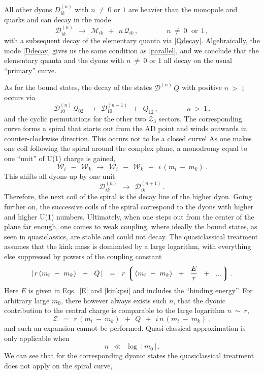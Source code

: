 \documentclass[epsfig,12pt]{article}
\def\beq{\begin{equation}}
\def\eeq{\end{equation}}
\def\beq{\begin{equation}}
\def\eeq{\end{equation}}
\newcommand{\mc}[1]{\mathcal{#1}}
\newcommand{\lgr}{\left\lgroup}
\newcommand{\rgr}{\right\rgroup}
\newcommand{\W}{\mathcal{W}}
\newcommand{\M}{\mathcal{M}}
\newcommand{\Q}{\mathcal{Q}}
\newcommand{\D}{\mathcal{D}}
\begin{document}
	All other dyons $ D_{ik}^{(n)} $ with $ n ~\neq~ 0 $ or $ 1 $ are heavier than the monopole and quarks and can decay in the mode
\beq
\label{Ddecay}
	\D_{ik}^{(n)}  ~~\longrightarrow~~ \M_{ik} ~~+~~ n\, \Q_{ik} \,, \qquad\qquad n ~\neq~ 0\, ~~\text{or}~~ 1\,,
\eeq
	with a subsequent decay of the elementary quanta via \eqref{Qdecay}.
	Algebraically, the mode \eqref{Ddecay} gives us the same condition as \eqref{parallel}, and 
	we conclude that the elementary quanta and the dyons with $ n ~\neq~ 0 $ or $ 1 $ all decay 
	on the usual ``primary'' curve.

	As for the bound states, the decay of the states $ \D^{(n)}\, Q $ with positive $ n ~>~ 1 $ occurs via
\beq
\label{spirpos}
	\D^{(n)}_{10}\, \Q_{02}  ~~\longrightarrow~~  \D^{(n-1)}_{10}  ~~+~~  Q_{12}\,,
	\qquad\qquad
	n ~>~ 1\,.
\eeq
	and the cyclic permutations for the other two $ \mc{Z}_3 $ sectors.
	The corresponding curve forms a spiral that starts out from the AD point and winds outwards in counter-clockwise direction.
	This occurs not to be a closed curve!
	As one makes one coil following the spiral around the complex plane, a monodromy equal to one ``unit'' of U(1)
	charge is gained,
\beq
	\W_i  ~~-~~ \W_k  ~~\longrightarrow~~  \W_i  ~~-~~ \W_k  ~~+~~  i\, ( m_i ~-~ m_k )\,.
\eeq
	This shifts all dyons up by one unit 
\beq
	\D^{(n)}_{ik}  ~~\longrightarrow~~  \D^{(n+1)}_{ik}\,.
\eeq
	Therefore, the next coil of the spiral is the decay line of the higher dyon. 
	Going further on, the successive coils of the spiral correspond to the dyons with higher and higher U(1) numbers.
	Ultimately, when one steps out from the center of the plane far enough, one comes to weak coupling,
	where ideally the bound states, as seen in quasiclassics, are stable and could not decay.
	The quasiclassical treatment assumes that the kink mass is dominated by a large logarithm,
	with everything else suppressed by powers of the coupling constant
\beq
	|\, r\, ( m_i ~-~ m_k ) ~~+~~ Q \, |  ~~=~~  r \, \lgr\, ( m_i ~-~ m_k ) ~~+~~ \frac{ E }{r} ~~+~~ ... \,\rgr .
\eeq
	Here $ E $ is given in Eqs.~\eqref{E} and \eqref{kinkpsi} and includes the ``binding energy''.
	For arbitrary large $ m_0 $, there however always exists such $ n $, that the dyonic contribution to the central charge
	is comparable to the large logarithm $ n ~\sim~ r $, 
\beq
	\mc{Z} ~~=~~ r \, ( m_i ~-~ m_k ) ~~+~~ Q ~~+~~ i\, n\, ( m_i ~-~ m_k )\,,
\eeq
	and such an expansion cannot be performed.
	Quasi-classical approximation is only applicable when
\beq
	n  ~~\ll~~  \log\; |\, m_0 \,| \,.
\eeq
	We can see that for the corresponding dyonic states the quasiclassical treatment does not apply on the spiral curve, 
\end{document}
